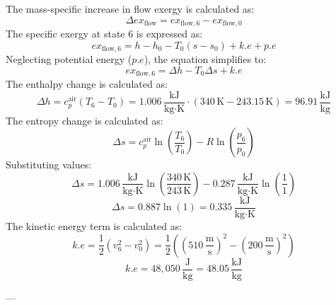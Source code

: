 The mass-specific increase in flow exergy is calculated as:  
\[
\Delta ex_{\text{flow}} = ex_{\text{flow},6} - ex_{\text{flow},0}
\]  
The specific exergy at state 6 is expressed as:  
\[
ex_{\text{flow},6} = h - h_0 - T_0 (s - s_0) + k.e + p.e
\]  
Neglecting potential energy (\(p.e\)), the equation simplifies to:  
\[
ex_{\text{flow},6} = \Delta h - T_0 \Delta s + k.e
\]  
The enthalpy change is calculated as:  
\[
\Delta h = c_p^{\text{air}} (T_6 - T_0) = 1.006 \, \frac{\text{kJ}}{\text{kg·K}} \cdot (340 \, \text{K} - 243.15 \, \text{K}) = 96.91 \, \frac{\text{kJ}}{\text{kg}}
\]  
The entropy change is calculated as:  
\[
\Delta s = c_p^{\text{air}} \ln\left(\frac{T_6}{T_0}\right) - R \ln\left(\frac{p_6}{p_0}\right)
\]  
Substituting values:  
\[
\Delta s = 1.006 \, \frac{\text{kJ}}{\text{kg·K}} \ln\left(\frac{340 \, \text{K}}{243 \, \text{K}}\right) - 0.287 \, \frac{\text{kJ}}{\text{kg·K}} \ln\left(\frac{1}{1}\right)
\]  
\[
\Delta s = 0.887 \ln(1) = 0.335 \, \frac{\text{kJ}}{\text{kg·K}}
\]  
The kinetic energy term is calculated as:  
\[
k.e = \frac{1}{2} (v_6^2 - v_0^2) = \frac{1}{2} \left((510 \, \frac{\text{m}}{\text{s}})^2 - (200 \, \frac{\text{m}}{\text{s}})^2\right)
\]  
\[
k.e = 48,050 \, \frac{\text{J}}{\text{kg}} = 48.05 \, \frac{\text{kJ}}{\text{kg}}
\]  

---